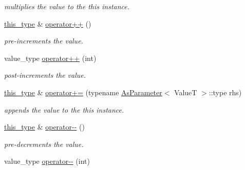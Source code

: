 \begin{DoxyCompactItemize}
\begin{DoxyCompactList}\small\item\em multiplies the value to the this instance. \end{DoxyCompactList}\item 
\hypertarget{group__atomic__operation_ga32d8b99a3de61e36c7a0bc7aeb546a0d}{\hyperlink{classhryky_1_1atomic_1_1_writer_a6b1cad65fb3ef1a993a5eb9e91450aea}{this\-\_\-type} \& \hyperlink{group__atomic__operation_ga32d8b99a3de61e36c7a0bc7aeb546a0d}{operator++} ()}\label{group__atomic__operation_ga32d8b99a3de61e36c7a0bc7aeb546a0d}

\begin{DoxyCompactList}\small\item\em pre-\/increments the value. \end{DoxyCompactList}\item 
\hypertarget{group__atomic__operation_gaf9a6947db23cf27f26693b4a03030829}{value\-\_\-type \hyperlink{group__atomic__operation_gaf9a6947db23cf27f26693b4a03030829}{operator++} (int)}\label{group__atomic__operation_gaf9a6947db23cf27f26693b4a03030829}

\begin{DoxyCompactList}\small\item\em post-\/increments the value. \end{DoxyCompactList}\item 
\hypertarget{group__atomic__operation_gaa862338a2dbded8f334c6e2aa0d45e88}{\hyperlink{classhryky_1_1atomic_1_1_writer_a6b1cad65fb3ef1a993a5eb9e91450aea}{this\-\_\-type} \& \hyperlink{group__atomic__operation_gaa862338a2dbded8f334c6e2aa0d45e88}{operator+=} (typename \hyperlink{classhryky_1_1_as_parameter}{As\-Parameter}$<$ Value\-T $>$\-::type rhs)}\label{group__atomic__operation_gaa862338a2dbded8f334c6e2aa0d45e88}

\begin{DoxyCompactList}\small\item\em appends the value to the this instance. \end{DoxyCompactList}\item 
\hypertarget{group__atomic__operation_ga6a2f90286d2b8aef610b7ae4cef1f9e7}{\hyperlink{classhryky_1_1atomic_1_1_writer_a6b1cad65fb3ef1a993a5eb9e91450aea}{this\-\_\-type} \& \hyperlink{group__atomic__operation_ga6a2f90286d2b8aef610b7ae4cef1f9e7}{operator-\/-\/} ()}\label{group__atomic__operation_ga6a2f90286d2b8aef610b7ae4cef1f9e7}

\begin{DoxyCompactList}\small\item\em pre-\/decrements the value. \end{DoxyCompactList}\item 
\hypertarget{group__atomic__operation_ga034cdbf5814223426e50001330c6dddd}{value\-\_\-type \hyperlink{group__atomic__operation_ga034cdbf5814223426e50001330c6dddd}{operator-\/-\/} (int)}\label{group__atomic__operation_ga034cdbf5814223426e50001330c6dddd}


\end{DoxyCompactItemize}
